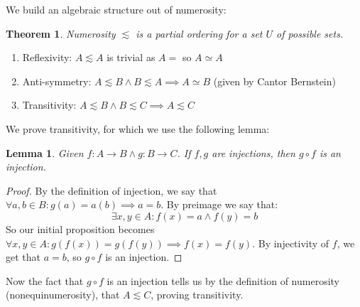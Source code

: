 \documentclass{article}
\newtheorem{thm}{Theorem}[section]
\newtheorem{lem}{Lemma}[section]
\begin{document}
We build an algebraic structure out of numerosity:
\begin{thm}
Numerosity $\lesssim$ is a partial ordering for a set $U$ of possible sets.
\end{thm}
\begin{enumerate}
    \item Reflexivity: $A \lesssim A$ is trivial as $A = $ so $A \simeq A$
    \item Anti-symmetry: $A \lesssim B \land B \lesssim A \implies A \simeq B$ (given by Cantor Bernstein)
    \item Transitivity: $A \lesssim B \land B \lesssim C \implies A \lesssim C$
\end{enumerate}
We prove transitivity, for which we use the following lemma:
\begin{lem}
Given $f: A \xrightarrow{} B \land g: B \xrightarrow{} C$. If $f, g$ are injections, then $g \circ f$ is an injection.
\end{lem}
\begin{proof}
By the definition of injection, we say that $\forall a, b \in B: g(a) = a(b) \implies a = b$. By preimage we say that:
\begin{equation*}
    \exists x, y \in A: f(x) = a \land f(y) = b
\end{equation*}
So our initial proposition becomes $\forall x, y \in A: g(f(x)) = g(f(y)) \implies f(x) = f(y)$. By injectivity of $f$, we get that $a = b$, so $g \circ f$ is an injection.
\end{proof}

Now the fact that $g \circ f$ is an injection tells us by the definition of numerosity (nonequinumerosity), that $A \lesssim C$, proving transitivity.\\
\end{document}
